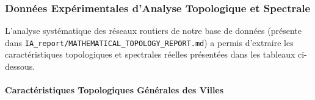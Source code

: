 \documentclass[10pt, a4paper]{article}
\begin{document}
\subsubsection{Données Expérimentales d'Analyse Topologique et
Spectrale}\label{donnuxe9es-expuxe9rimentales-danalyse-topologique-et-spectrale}

L'analyse systématique des réseaux routiers de notre base de données
(présente dans \texttt{IA\_report/MATHEMATICAL\_TOPOLOGY\_REPORT.md}) a
permis d'extraire les caractéristiques topologiques et spectrales
réelles présentées dans les tableaux ci-dessous.

\paragraph{Caractéristiques Topologiques Générales des
Villes}\label{caractuxe9ristiques-topologiques-guxe9nuxe9rales-des-villes}
\end{document}
